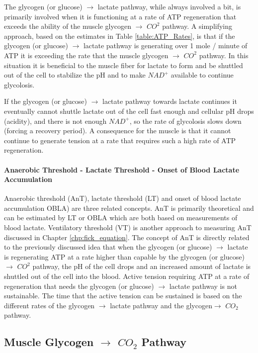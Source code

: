 The glycogen (or glucose) $\rightarrow$ lactate pathway, while always involved a bit, is primarily involved when it is functioning at a rate of ATP regeneration that exceeds the ability of the muscle glycogen $\rightarrow$ $CO^2$ pathway. A simplifying approach, based on the estimates in Table \ref{table:ATP_Rates}, is that if the glycogen (or glucose) $\rightarrow$ lactate pathway is generating over 1 mole / minute of ATP it is exceeding the rate that the muscle glycogen $\rightarrow$ $CO^2$ pathway. In this situation it is beneficial to the muscle fiber for lactate to form and be shuttled out of the cell to stabilize the pH and to make $NAD^+$ available to continue glycolosis. 

If the glycogen (or glucose) $\rightarrow$ lactate pathway towards lactate continues it eventually cannot shuttle lactate out of the cell fast enough and cellular pH drops (acidity), and there is not enough $NAD^+$, so the rate of glycolosis slows down (forcing a recovery period). A consequence for the muscle is that it cannot continue to generate tension at a rate that requires such a high rate of ATP regeneration.

\paragraph{Anaerobic Threshold - Lactate Threshold - Onset of Blood Lactate Accumulation}
Anaerobic threshold (AnT), lactate threshold (LT) and onset of blood lactate accumulation OBLA) are three related concepts. AnT is primarily theoretical and can be estimated by LT or OBLA which are both based on measurements of blood lactate. Ventilatory threshold (VT) is another approach to measuring AnT discussed in Chapter \ref{chp:fick_equation}. The concept of AnT is directly related to the previously discussed idea that when the glycogen (or glucose) $\rightarrow$ lactate is regenerating ATP at a rate higher than capable by the glycogen (or glucose) $\rightarrow$ $CO^2$ pathway, the pH of the cell drops and an increased amount of lactate is shuttled out of the cell into the blood. Active tension requiring ATP at a rate of regeneration that needs the glycogen (or glucose) $\rightarrow$ lactate pathway is not sustainable. The time that the active tension can be sustained is based on the different rates of the glycogen $\rightarrow$ lactate pathway and the glycogen$\rightarrow$ $CO_2$ pathway.

\subsection{Muscle Glycogen $\rightarrow$ $CO_2$ Pathway}

